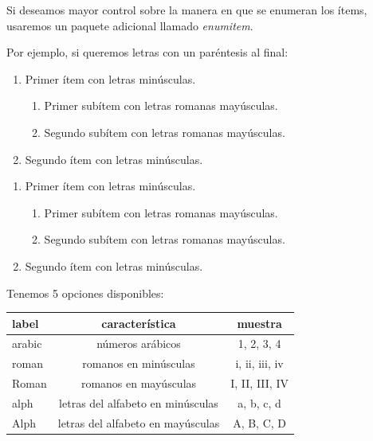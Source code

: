 \documentclass[graybox,envcountchap,sectrefs]{svmono}
\begin{document}
    Si deseamos mayor control sobre la manera en que se enumeran los ítems, 
    usaremos un paquete adicional llamado \emph{enumitem}.

    Por ejemplo, si queremos letras con un paréntesis al final:
    \begin{code}
        \begin{enumerate}[label=\alph*)]
            \item Primer ítem con letras minúsculas.
                \begin{enumerate}[label=\Roman*.]
                    \item Primer subítem con letras romanas mayúsculas.
                    \item Segundo subítem con letras romanas mayúsculas.
                \end{enumerate}
            \item Segundo ítem con letras minúsculas.
        \end{enumerate}
    \end{code}
    \begin{compiled}
        \begin{enumerate}[label=\alph*)]
            \item Primer ítem con letras minúsculas.
                \begin{enumerate}[label=\Roman*.]
                    \item Primer subítem con letras romanas mayúsculas.
                    \item Segundo subítem con letras romanas mayúsculas.
                \end{enumerate}
            \item Segundo ítem con letras minúsculas.
        \end{enumerate}
    \end{compiled}

    Tenemos 5 opciones disponibles:
     \begin{table}[h]
         \centering
         \begin{tabular}{lcc}
             \toprule 
             label      & característica        & muestra \\
             \midrule
             arabic     & números arábicos      & 1, 2, 3, 4 \\
             roman      & romanos en minúsculas & i, ii, iii, iv \\
             Roman      & romanos en mayúsculas & I, II, III, IV \\
             alph       & letras del alfabeto en minúsculas & a, b, c, d \\
             Alph       & letras del alfabeto en mayúsculas & A, B, C, D \\
             \bottomrule
        \end{tabular}
    \end{table}
\end{document}
